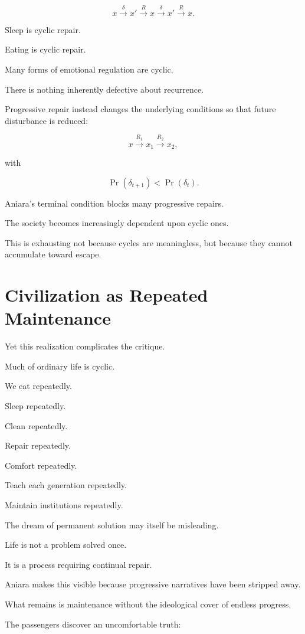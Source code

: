 \documentclass[11pt,oneside]{book}
\theoremstyle{definition}
\theoremstyle{remark}
\begin{document}
\[
x
\xrightarrow{\delta}
x'
\xrightarrow{R}
x
\xrightarrow{\delta}
x'
\xrightarrow{R}
x.
\]

Sleep is cyclic repair.

Eating is cyclic repair.

Many forms of emotional regulation are cyclic.

There is nothing inherently defective about recurrence.

Progressive repair instead changes the underlying conditions so that future disturbance is reduced:

\[
x
\xrightarrow{R_1}
x_1
\xrightarrow{R_2}
x_2,
\]

with

\[
\Pr(\delta_{t+1})<\Pr(\delta_t).
\]

Aniara's terminal condition blocks many progressive repairs.

The society becomes increasingly dependent upon cyclic ones.

This is exhausting not because cycles are meaningless, but because they cannot accumulate toward escape.

\section{Civilization as Repeated Maintenance}

Yet this realization complicates the critique.

Much of ordinary life is cyclic.

We eat repeatedly.

Sleep repeatedly.

Clean repeatedly.

Repair repeatedly.

Comfort repeatedly.

Teach each generation repeatedly.

Maintain institutions repeatedly.

The dream of permanent solution may itself be misleading.

Life is not a problem solved once.

It is a process requiring continual repair.

Aniara makes this visible because progressive narratives have been stripped away.

What remains is maintenance without the ideological cover of endless progress.

The passengers discover an uncomfortable truth:
\end{document}
